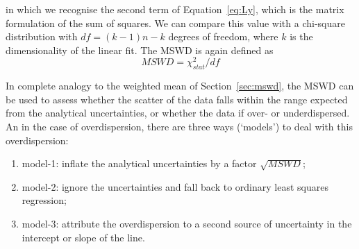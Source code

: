 \begin{refsection}
\noindent in which we recognise the second term of
Equation~\ref{eq:Ly}, which is the matrix formulation of the sum of
squares. We can compare this value with a chi-square distribution with
$df = (k-1) n - k$ degrees of freedom, where $k$ is the dimensionality
of the linear fit. The MSWD is again defined as
\[
MSWD = \chi^2_{stat}/df
\]

In complete analogy to the weighted mean of Section~\ref{sec:mswd},
the MSWD can be used to assess whether the scatter of the data falls
within the range expected from the analytical uncertainties, or
whether the data if over- or underdispersed. An in the case of
overdispersion, there are three ways (`models') to deal with this
overdispersion:

\begin{enumerate}
\item model-1: inflate the analytical uncertainties by a factor
  $\sqrt{MSWD}$;
\item model-2: ignore the uncertainties and fall back to ordinary
  least squares regression;
\item model-3: attribute the overdispersion to a second source of
  uncertainty in the intercept or slope of the line.
\end{enumerate}


\end{refsection}

